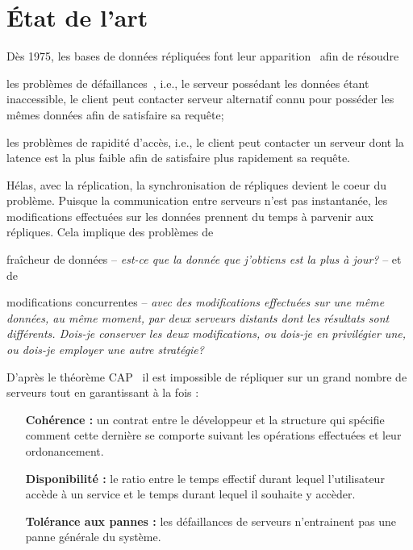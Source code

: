 

\section{État de l'art}
\label{repl:sec:stateoftheart}

Dès 1975, les bases de données répliquées font leur
apparition~\cite{johnson1975maintenance} afin de résoudre
\begin{inparaenum}[(i)]
\item les problèmes de défaillances~\cite{alsberg1976principle}, i.e., le
  serveur possédant les données étant inaccessible, le client peut contacter
  serveur alternatif connu pour posséder les mêmes données afin de satisfaire sa
  requête;
\item les problèmes de rapidité d'accès, i.e., le client peut contacter un
  serveur dont la latence est la plus faible afin de satisfaire plus rapidement
  sa requête.
\end{inparaenum}

Hélas, avec la réplication, la synchronisation de répliques devient le coeur du
problème. Puisque la communication entre serveurs n'est pas instantanée, les
modifications effectuées sur les données prennent du temps à parvenir aux
répliques. Cela implique des problèmes de
\begin{inparaenum}[(i)]
\item fraîcheur de données -- \emph{est-ce que la donnée que j'obtiens est la
    plus à jour?} -- et de
\item modifications concurrentes -- \emph{avec des modifications effectuées sur
    une même données, au même moment, par deux serveurs distants dont les
    résultats sont différents. Dois-je conserver les deux modifications, ou
    dois-je en privilégier une, ou dois-je employer une autre stratégie?}
\end{inparaenum}


D'après le théorème CAP~\cite{gilbert2002brewer} il est impossible de répliquer
sur un grand nombre de serveurs tout en garantissant à la fois :
\begin{itemize}
\item [\textbf{Cohérence :}] un contrat entre le développeur et la structure qui
  spécifie comment cette dernière se comporte suivant les opérations effectuées
  et leur ordonancement.
\item [\textbf{Disponibilité :}] le ratio entre le temps effectif durant lequel
  l'utilisateur accède à un service et le temps durant lequel il souhaite y
  accèder.
\item [\textbf{Tolérance aux pannes :}] les défaillances de serveurs
  n'entrainent pas une panne générale du système.
\end{itemize}

